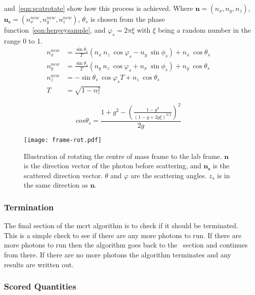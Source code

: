  and~\cref{eqn:scatrotate} show how this process is achieved.
Where $\mathbf{n}=(n_x,n_y,n_z)$, $\mathbf{n_s}=(n_{x}^{new},n_{y}^{new},n_{z}^{new})$, $\theta_s$ is chosen from the phase function~\cref{eqn:henyeysample}, and $\varphi_s=2\pi \xi$ with $\xi$ being a random number in the range 0 to 1.
\begin{equation}
	\begin{aligned}
		n_{x}^{new} &= \frac{\sin\theta_s}{T} \left(n_x\ n_z\ \cos\varphi_s - n_y\ \sin\phi_s\right) + n_x\ \cos\theta_s \\
		n_{y}^{new} &= \frac{\sin\theta_s}{T} \left(n_y\ n_z\ \cos\varphi_s + n_x\ \sin\phi_s\right) + n_y\ \cos\theta_s \\
		n_{z}^{new} &= -\sin\theta_s\ \cos\varphi_s T + n_z\ \cos\theta_s\\
		T &= \sqrt{1-n_z^2}
	\end{aligned}
	\label{eqn:scatrotate}
\end{equation}

\begin{equation}
cos\theta_s = \frac{1+g^2-\left(\frac{1-g^2}{(1-g+2g\xi)^{3/2}}\right)^2}{2g}
\label{eqn:henyeysample}
\end{equation}


\begin{figure}[!htbp]
	\centering
	\texttt{[image: frame-rot.pdf]}
	\caption{Illustration of rotating the centre of mass frame to the lab frame. $\mathbf{n}$ is the direction vector of the photon before scattering, and $\mathbf{n_s}$ is the scattered direction vector. $\theta$ and $\varphi$ are the scattering angles. $z_s$ is in the same direction as $\mathbf{n}$.}
	\label{fig:labframerotate}
\end{figure}


\subsubsection*{Termination}\label{sec:terminator}

The final section of the \gls*{mcrt} algorithm is to check if it should be terminated. This is a simple check to see if there are any more photons to run.
If there are more photons to run then the algorithm goes back to the~ section and continues from there.
If there are no more photons the algorithm terminates and any results are written out.


\subsubsection*{Scored Quantities}\label{sec:fluencecalc}

